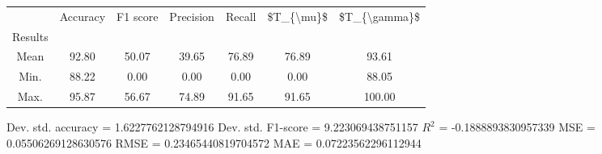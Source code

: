 \begin{tabular}{|c|c|c|c|c|c|c|}
\toprule
{} &  Accuracy &  F1 score &  Precision &  Recall &  \$T\_\{\textbackslash mu\}\$ &  \$T\_\{\textbackslash gamma\}\$ \\
Results &           &           &            &         &            &               \\
\hline
Mean    &     92.80 &     50.07 &      39.65 &   76.89 &      76.89 &         93.61 \\
Min.    &     88.22 &      0.00 &       0.00 &    0.00 &       0.00 &         88.05 \\
Max.    &     95.87 &     56.67 &      74.89 &   91.65 &      91.65 &        100.00 \\
\bottomrule
\end{tabular}

 Dev. std. accuracy = 1.6227762128794916
 Dev. std. F1-score = 9.223069438751157
 $R^2$ = -0.1888893830957339
 MSE = 0.05506269128630576
 RMSE = 0.23465440819704572
 MAE = 0.07223562296112944